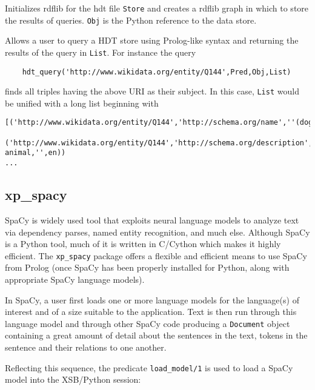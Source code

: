 \begin{description}
  Initializes rdflib for the hdt file {\tt Store} and creates a rdflib
  graph in which to store the results of queries.  {\tt Obj} is the
  Python reference to the data store.
  

  Allows a user to query a HDT store using Prolog-like syntax and
  returning the results of the query in {\tt List}.  For instance the query
\begin{verbatim}
    hdt_query('http://www.wikidata.org/entity/Q144',Pred,Obj,List)
\end{verbatim}
finds all triples having the above URI as their subject.  In this
case, {\tt List} would be unified with a long list beginning with
\begin{footnotesize}
\begin{verbatim}
[('http://www.wikidata.org/entity/Q144','http://schema.org/name',''(dog,'',en))
 ('http://www.wikidata.org/entity/Q144','http://schema.org/description',''('domestic animal,'',en))
...
\end{verbatim}
\end{footnotesize}
\end{description}



\subsection{xp\_spacy}
SpaCy is widely used tool that exploits neural language models to
analyze text via dependency parses, named entity recognition, and much
else.  Although SpaCy is a Python tool, much of it is written in
C/Cython which makes it highly efficient.  The {\tt xp\_spacy} package
offers a flexible and efficient means to use SpaCy from Prolog (once
SpaCy has been properly installed for Python, along with appropriate
SpaCy language models).

In SpaCy, a user first loads one or more language models for the
language(s) of interest and of a size suitable to the application.
Text is then run through this language model and through other SpaCy
code producing a {\tt Document} object containing a great amount of
detail about the sentences in the text, tokens in the sentence and
their relations to one another.

Reflecting this sequence, the predicate {\tt load\_model/1} is used to
load a SpaCy model into the XSB/Python session:

